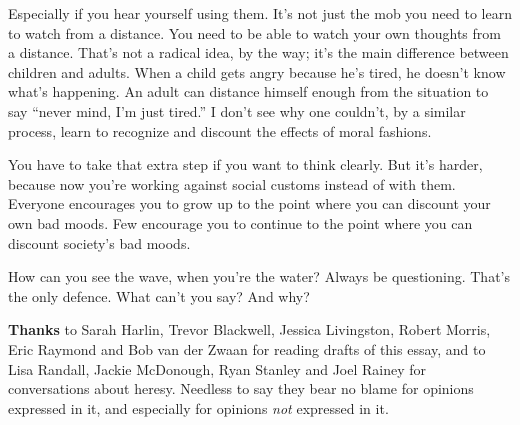 Especially if you hear yourself using them. It's not just the mob you
need to learn to watch from a distance. You need to be able to watch
your own thoughts from a distance. That's not a radical idea, by the
way; it's the main difference between children and adults. When a child
gets angry because he's tired, he doesn't know what's happening. An
adult can distance himself enough from the situation to say ``never
mind, I'm just tired.'' I don't see why one couldn't, by a similar
process, learn to recognize and discount the effects of moral fashions.

You have to take that extra step if you want to think clearly. But it's
harder, because now you're working against social customs instead of
with them. Everyone encourages you to grow up to the point where you can
discount your own bad moods. Few encourage you to continue to the point
where you can discount society's bad moods.

How can you see the wave, when you're the water? Always be questioning.
That's the only defence. What can't you say? And why?

\textbf{Thanks} to Sarah Harlin, Trevor Blackwell, Jessica Livingston,
Robert Morris, Eric Raymond and Bob van der Zwaan for reading drafts of
this essay, and to Lisa Randall, Jackie McDonough, Ryan Stanley and Joel
Rainey for conversations about heresy. Needless to say they bear no
blame for opinions expressed in it, and especially for opinions
\emph{not} expressed in it.